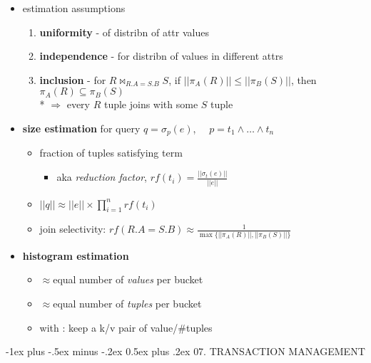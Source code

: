 \documentclass[10pt, landscape]{article}
\makeatletter
\renewcommand{\section}{\@startsection{section}{1}{0mm}%
  {-1ex plus -.5ex minus -.2ex}%
  {0.5ex plus .2ex}%
{\normalfont\large\bfseries}}
\makeatother
\begin{document}
\begin{multicols*}{4}
  \begin{itemize}
    \item estimation assumptions
          \begin{enumerate}
            \item \textbf{uniformity} - of distribn of attr values
            \item \textbf{independence} - for distribn of values in different attrs
            \item \textbf{inclusion} - for $R \bowtie_{R.A=S.B}S$, if $||\pi_A(R)|| \leq ||\pi_B(S)||$, then $\pi_A(R) \subseteq \pi_B(S)$
                  \\* $\Rightarrow$ every $R$ tuple joins with some $S$ tuple
          \end{enumerate}
    \item \textbf{size estimation} for query $q = \sigma_p(e)$,  $\quad p = t_1 \land \dots \land t_n$
          \begin{itemize}
            \item {} fraction of tuples satisfying term
                  \begin{itemize}
                    \item aka \textit{reduction factor}, $rf(t_i) = \frac{||\sigma_t(e)||}{||e||}$
                  \end{itemize}
            \item $||q|| \approx ||e|| \times \prod^n_{i=1}rf(t_i)$
            \item join selectivity: $rf(R.A=S.B) \approx \frac{1}{\max\{||\pi_A(R)||, ||\pi_B(S)||\}}$
          \end{itemize}
    \item \textbf{histogram estimation}
          \begin{itemize}
            \item {} $\approx$equal number of \textit{values} per bucket
            \item {} $\approx$equal number of \textit{tuples} per bucket
            \item with : keep a k/v pair of value/\#tuples
          \end{itemize}
  \end{itemize}

  \section{07. TRANSACTION MANAGEMENT}


\end{multicols*}
\end{document}
